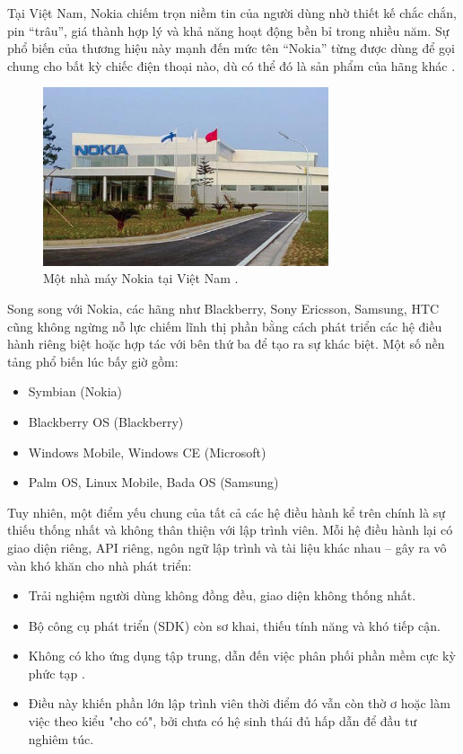   \hspace*{0.8cm}Tại Việt Nam, Nokia chiếm trọn niềm tin của người dùng nhờ thiết kế chắc chắn, pin “trâu”, giá thành hợp lý và khả năng hoạt động bền bỉ trong nhiều năm. Sự phổ biến của thương hiệu này mạnh đến mức tên “Nokia” từng được dùng để gọi chung cho bất kỳ chiếc điện thoại nào, dù có thể đó là sản phẩm của hãng khác \cite{nokia-vietnam-popularity}.
  

\begin{figure}[H]
  \centering
  \includegraphics[width=0.75\textwidth]{images/nokia-4d687.jpg}
  \caption{Một nhà máy Nokia tại Việt Nam \cite{vneconomyNokia}.}
  \label{fig:fig8}
\end{figure}

  
  \hspace*{0.8cm}Song song với Nokia, các hãng như Blackberry, Sony Ericsson, Samsung, HTC cũng không ngừng nỗ lực chiếm lĩnh thị phần bằng cách phát triển các hệ điều hành riêng biệt hoặc hợp tác với bên thứ ba để tạo ra sự khác biệt. Một số nền tảng phổ biến lúc bấy giờ gồm:
  \begin{itemize}
  \item Symbian (Nokia)
  \item Blackberry OS (Blackberry)
  \item Windows Mobile, Windows CE (Microsoft)
  \item Palm OS, Linux Mobile, Bada OS (Samsung)
  \end{itemize}
  
  
  
  \hspace*{0.8cm}Tuy nhiên, một điểm yếu chung của tất cả các hệ điều hành kể trên chính là sự thiếu thống nhất và không thân thiện với lập trình viên. Mỗi hệ điều hành lại có giao diện riêng, API riêng, ngôn ngữ lập trình và tài liệu khác nhau – gây ra vô vàn khó khăn cho nhà phát triển:
  \begin{itemize}
  \item Trải nghiệm người dùng không đồng đều, giao diện không thống nhất.
  \item Bộ công cụ phát triển (SDK) còn sơ khai, thiếu tính năng và khó tiếp cận.
  \item Không có kho ứng dụng tập trung, dẫn đến việc phân phối phần mềm cực kỳ phức tạp \cite{pre-appstore-dev}.
  \item[]Điều này khiến phần lớn lập trình viên thời điểm đó vẫn còn thờ ơ hoặc làm việc theo kiểu "cho có", bởi chưa có hệ sinh thái đủ hấp dẫn để đầu tư nghiêm túc.
  \end{itemize}
  
